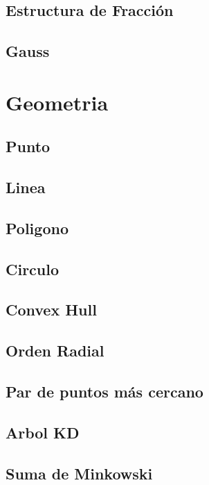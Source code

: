 \documentclass[a4paper,11pt,landscape,twocolumn]{article}
\begin{document}
\subsection{Estructura de Fracción}

\subsection{Gauss}


\section{Geometria} %
\subsection{Punto}

\subsection{Linea}

\subsection{Poligono}

\subsection{Circulo}

\subsection{Convex Hull}

\subsection{Orden Radial}

\subsection{Par de puntos más cercano}

\subsection{Arbol KD}

\subsection{Suma de Minkowski}

\end{document}

